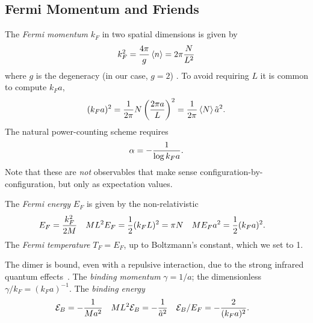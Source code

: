 \subsection{Fermi Momentum and Friends}\label{sec:kF}

The \emph{Fermi momentum} $k_F$ in two spatial dimensions is given by
\begin{align}
    k_F^2 = \frac{4\pi}{g} \left\langle n \right\rangle = 2\pi \frac{N}{L^2}
    \label{eq:kF}
\end{align}
where $g$ is the degeneracy (in our case, $g=2$) \cite{Beane:2022wcn}.
To avoid requiring $L$ it is common to compute $k_F a$,
\begin{align}
    (k_F a)^2 = \frac{1}{2\pi} N \left(\frac{2\pi a}{L}\right)^2 = \frac{1}{2\pi} \left\langle N \right\rangle \tilde{a}^2.
    \label{eq:kF a}
\end{align}
The natural power-counting scheme requires\cite{Beane:2022wcn}
\begin{align}
    \alpha = - \frac{1}{\log k_F a}.
    \label{eq:alpha}
\end{align}
Note that these are \emph{not} observables that make sense configuration-by-configuration, but only as expectation values.

The \emph{Fermi energy} $E_F$ is given by the non-relativistic
\begin{align}
    E_F &= \frac{k_F^2}{2M}
    &
    ML^2 E_F &= \frac{1}{2} (k_F L)^2 = \pi N
    &
    ME_F a^2 &= \frac{1}{2} (k_F a)^2.
\end{align}
The \emph{Fermi temperature} $T_F=E_F$, up to Boltzmann's constant, which we set to 1.

The dimer is bound, even with a repulsive interaction, due to the strong infrared quantum effects~\cite{Beane:2022wcn}.
The \emph{binding momentum} $\gamma=1/a$; the dimensionless $\gamma/k_F = (k_F a)^{-1}$.
The \emph{binding energy} \binding
\begin{align}
    \mathcal{E}_B &= - \frac{1}{Ma^2}
    &
    ML^2 \mathcal{E}_B &= - \frac{1}{\tilde{a}^2}
    &
    \mathcal{E}_B / E_F &= - \frac{2}{(k_F a)^2}.
\end{align}
